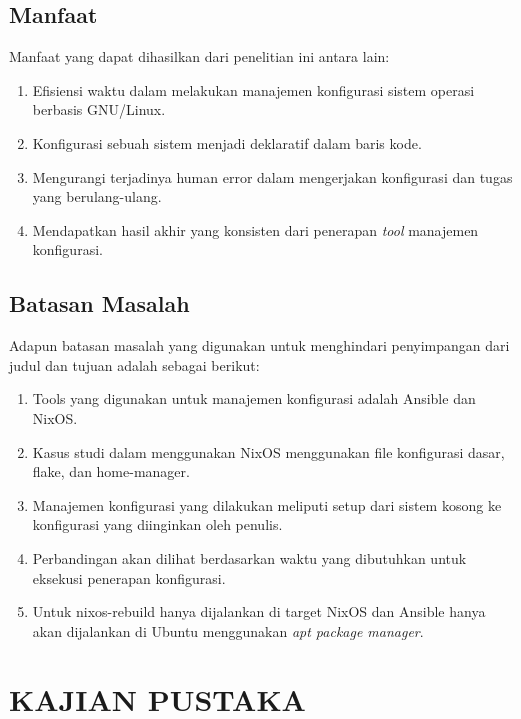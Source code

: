 \documentclass[10pt,]{report}
\begin{document}
\section{Manfaat}
\vspace{-3mm}
\begin{adjustwidth}{0.70cm}{}
	Manfaat yang dapat dihasilkan dari penelitian ini antara lain:
	\begin{enumerate}[leftmargin=0.45cm]
		\item Efisiensi waktu dalam melakukan manajemen konfigurasi sistem operasi berbasis GNU/Linux.
		\item Konfigurasi sebuah sistem menjadi deklaratif dalam baris kode.
		\item Mengurangi terjadinya human error dalam mengerjakan konfigurasi dan tugas yang berulang-ulang.
		\item Mendapatkan hasil akhir yang konsisten dari penerapan \textit{tool} manajemen konfigurasi.
	\end{enumerate}
\end{adjustwidth}
\vspace{3mm}
\section{Batasan Masalah}
\vspace{-3mm}
\begin{adjustwidth}{0.70cm}{}
	Adapun batasan masalah yang digunakan untuk menghindari penyimpangan dari judul dan tujuan adalah sebagai berikut:
	\begin{enumerate}[leftmargin=0.45cm]
		\item Tools yang digunakan untuk manajemen konfigurasi adalah Ansible dan
		      NixOS.
		\item Kasus studi dalam menggunakan NixOS menggunakan file konfigurasi
		      dasar, flake, dan home-manager.
		\item Manajemen konfigurasi yang dilakukan meliputi setup dari sistem
		      kosong ke konfigurasi yang diinginkan oleh penulis.
		\item Perbandingan akan dilihat berdasarkan waktu yang dibutuhkan untuk
		      eksekusi penerapan konfigurasi.
		\item Untuk nixos-rebuild hanya dijalankan di target NixOS dan Ansible hanya
		      akan dijalankan di Ubuntu menggunakan \textit{apt package manager}.
	\end{enumerate}
\end{adjustwidth}
\chapter{KAJIAN PUSTAKA}
\end{document}
